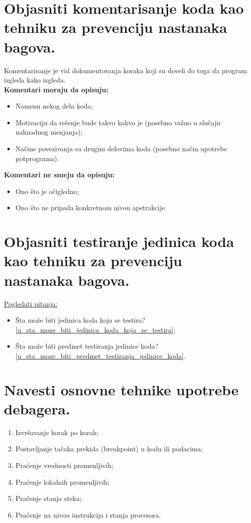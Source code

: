 \documentclass[a4paper]{article}
\begin{document}
\section{Objasniti komentarisanje koda kao tehniku za prevenciju nastanaka bagova.}
  Komentarisanje je vid dokumentovanja koraka koji su doveli do toga da program izgleda
  kako izgleda. \\
  \noindent \textbf{Komentari moraju da opisuju:}
  \begin{itemize}
    \item Namenu nekog dela koda;
    \item Motivaciju da rešenje bude takvo kakvo je (posebno važno u slučaju naknadnog menjanja);
    \item Načine povezivanja sa drugim delovima koda (posebno način upotrebe potprograma).
  \end{itemize}
  \textbf{Komentari ne smeju da opisuju:}
  \begin{itemize}
    \item Ono što je očigledno;
    \item Ono što ne pripada konkretnom nivou apstrakcije.
  \end{itemize}

\section{Objasniti testiranje jedinica koda kao tehniku za prevenciju nastanaka bagova.}
  \noindent \underline{Pogledati pitanja:} 
  \begin{itemize}
    \item Šta može biti jedinica koda koja se testira? 
          \ref{q_sta_moze_biti_jedinica_koda_koja_se_testira};
    \item Šta može biti predmet testiranja jedinice koda? 
          \ref{q_sta_moze_biti_predmet_testiranja_jedinice_koda}.
  \end{itemize}

\section{Navesti osnovne tehnike upotrebe debagera.}
  \begin{enumerate}
    \item Izvršavanje korak po korak;
    \item Postavljanje tačaka prekida (breakpoint) u kodu ili podacima;
    \item Praćenje vrednosti promenljivih;
    \item Praćenje lokalnih promenljivih;
    \item Praćenje stanja steka;
    \item Praćenje na nivou instrukcija i stanja procesora.
  \end{enumerate}
\end{document}
